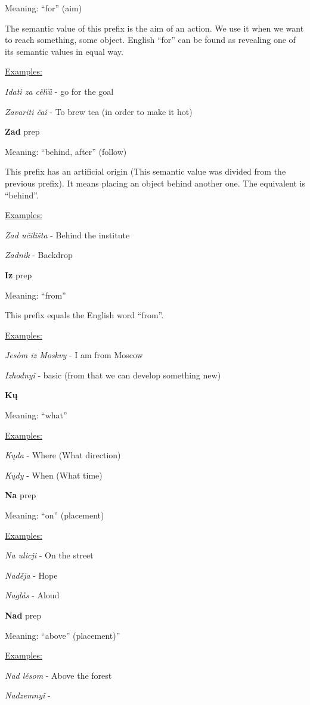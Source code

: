 Meaning: “for” (aim)

The semantic value of this prefix is the aim of an action. We use it when we want to reach something, some object. English “for” can be found as revealing one of its semantic values in equal way. 

\underline{Examples:}

\textit{Idati za cělïü} - go for the goal

\textit{Zavariti čaǐ }- To brew tea (in order to make it hot)

\textbf{Zad} \gls{prep}

Meaning: “behind, after” (follow)

This prefix has an artificial origin (This semantic value was divided from the previous prefix). It means placing an object behind another one. The equivalent is “behind”.

\underline{Examples:}

\textit{Zad učilišta} - Behind the institute

\textit{Zadnik} - Backdrop

\textbf{Iz} \gls{prep}

Meaning: “from”

This prefix equals the English word “from”. 

\underline{Examples:}

\textit{Jesòm iz Moskvy} - I am from Moscow

\textit{Izhodnyǐ} - basic (from that we can develop something new)

\textbf{Kų}

Meaning: “what”

\underline{Examples:}

\textit{Kųda} - Where (What direction)

\textit{Kųdy} - When (What time) 

\textbf{Na} \gls{prep}

Meaning: “on” (placement)

\underline{Examples:}

\textit{Na ulicji} - On the street

\textit{Naděja} - Hope

\textit{Naglås} - Aloud

\textbf{Nad} \gls{prep}

Meaning: “above” (placement)”

\underline{Examples:}

\textit{Nad lěsom} - Above the forest

\textit{Nadzemnyǐ} - 


